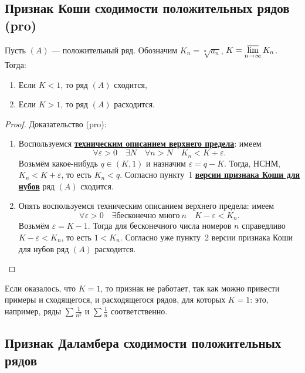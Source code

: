 \subsection{Признак Коши сходимости положительных рядов (pro)} \hypertarget{Коши-про}{}

\begin{theorem}
	Пусть \((A)\) --- положительный ряд. Обозначим \(K_n = \sqrt[n]{a_n}\), \(K = \varlimsup\limits_{n \to \infty} K_n\). Тогда:
	\begin{enumerate}
		\item Если \(K < 1\), то ряд \((A)\) сходится,
		\item Если \(K > 1\), то ряд \((A)\) расходится.
	\end{enumerate}
\end{theorem}
\begin{proof}
	Доказательство (pro):
	\begin{enumerate}
		\item Воспользуемся \hyperlink{техническое описание верхнего предела}{\bfseries техническим описанием верхнего предела}: имеем \[
			\forall \varepsilon > 0 \quad \exists N \quad \forall n > N \quad K_n < K + \varepsilon.
		\]
		Возьмём какое-нибудь \(q \in (K, 1)\) и назначим \(\varepsilon = q - K\). Тогда, НСНМ, \(K_n < K + \varepsilon\), то есть \(K_n < q\). Согласно пункту~1 \hyperlink{Коши-нуб}{\bfseries версии признака Коши для нубов} ряд \((A)\) сходится.
		\item Опять воспользуемся техническим описанием верхнего предела: имеем \[
			\forall \varepsilon > 0 \quad \exists \textit{бесконечно много} \ n \quad K - \varepsilon < K_n.
		\]
		Возьмём \(\varepsilon = K - 1\). Тогда для бесконечного числа номеров \(n\) справедливо \(K - \varepsilon < K_n\), то есть \(1 < K_n\). Согласно уже пункту~2 версии признака Коши для нубов ряд \((A)\) расходится.
	\end{enumerate}
\end{proof}

\begin{remark}
	Если оказалось, что \(K = 1\), то признак не работает, так как можно привести примеры и сходящегося, и расходящегося рядов, для которых \(K = 1\): это, например, ряды \(\sum \frac{1}{n^2}\) и \(\sum \frac{1}{n}\) соответственно.
\end{remark}

\subsection{Признак Даламбера сходимости положительных рядов}


